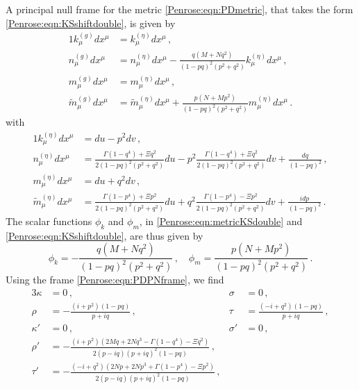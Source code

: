 A principal null frame for the metric \eqref{Penrose:eqn:PDmetric}, that takes the form \eqref{Penrose:eqn:KSshiftdouble}, is given by
\begin{alignat}{1}
k^{(g)}_{\mu}dx^{\mu} &= k^{(\eta)}_{\mu}dx^{\mu}  \, , \nonumber \\
n^{(g)}_{\mu}dx^{\mu} &= n^{(\eta)}_{\mu}dx^{\mu} - \frac{q (M+Nq^2)}{(1-pq)^2 (p^2+q^2)}   k^{(\eta)}_{\mu}dx^{\mu}  \, , \nonumber \\
m^{(g)}_{\mu}dx^{\mu} &= m^{(\eta)}_{\mu}dx^{\mu}  \, , \nonumber \\
\tilde{m}^{(g)}_{\mu}dx^{\mu} &= \tilde{m}^{(\eta)}_{\mu}dx^{\mu} + \frac{p (N+Mp^2)}{(1-pq)^2 (p^2+q^2)} m^{(\eta)}_{\mu}dx^{\mu} \, . \label{Penrose:eqn:PDPNframe}
\end{alignat}
with
\begin{alignat}{1}
k^{(\eta)}_{\mu}dx^{\mu} &= du -p^2 dv  \, , \nonumber \\
n^{(\eta)}_{\mu}dx^{\mu} &= \frac{\Gamma(1-q^4)+ \Xi q^2}{2 (1-pq)^2(p^2+q^2)} du - p^2\frac{\Gamma(1-q^4) + \Xi q^2 }{2 (1-pq)^2(p^2+q^2)} dv +\frac{dq}{(1-pq)^2}\, , \nonumber \\
m^{(\eta)}_{\mu}dx^{\mu} &= du +q^2 dv\, , \nonumber \\
\tilde{m}^{(\eta)}_{\mu}dx^{\mu} &= \frac{\Gamma(1-p^4)+ \Xi p^2}{2 (1-pq)^2(p^2+q^2)} du + q^2\frac{\Gamma(1-p^4) - \Xi p^2 }{2 (1-pq)^2(p^2+q^2)} dv +\frac{i dp}{(1-pq)^2} \, . \label{Penrose:eqn:PDPNframeflat}
\end{alignat}
The scalar functions $\phi_k$ and $\phi_m$, in \eqref{Penrose:eqn:metricKSdouble} and \eqref{Penrose:eqn:KSshiftdouble}, are thus given by
\begin{equation}
\phi_k = - \frac{q (M+Nq^2)}{(1-pq)^2 (p^2+q^2)}  \, , \quad \phi_m  = \frac{p (N+Mp^2)}{(1-pq)^2 (p^2+q^2)} \, .
\end{equation}
Using the frame \eqref{Penrose:eqn:PDPNframe}, we find
\begin{alignat}{3}
\kappa &= 0 \, ,  \quad &\sigma& = 0 \, , \nonumber \\  
\rho& = -\frac{(i + p^2)(1-pq)}{p+iq} \, , \quad  &\tau& =  \frac{(-i + q^2)(1-pq)}{p+iq}  \, , \nonumber \\
\kappa' &= 0 \, ,  \quad &\sigma'& = 0  \, , \nonumber\\ 
\rho' &= -\frac{(i+p^2)(2Mq+2Nq^3-\Gamma(1-q^4)-\Xi q^2)}{2(p-iq)(p+iq)^2(1-pq)} \, , \\ \tau' &= -\frac{(-i+q^2)(2Np+2Np^3+\Gamma(1-p^4)-\Xi p^2)}{2(p-iq)(p+iq)^2(1-pq)}  \, ,  
\label{Penrose:eqn:PDspincoeffssymbols}
\end{alignat}
